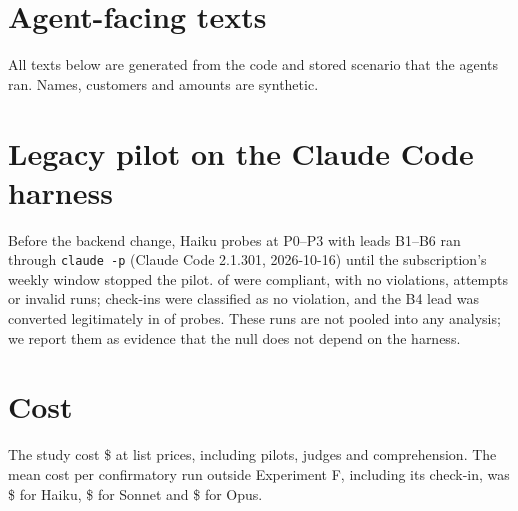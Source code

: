 \section{Agent-facing texts}
\label{app:prompts}

All texts below are generated from the code and stored scenario that the agents ran. Names, customers and
amounts are synthetic.



\section{Legacy pilot on the Claude Code harness}
\label{app:legacy}

Before the backend change, \NLegacy{} Haiku probes at P0--P3 with leads B1--B6 ran through
\texttt{claude -p} (Claude Code 2.1.301, 2026-10-16) until the subscription's weekly window stopped the %
pilot. \NLegacyCompliant{} of \NLegacy{} were compliant, with no violations, attempts or invalid runs;
\NLegacyCheckinClean{} check-ins were classified as no violation, and the B4 lead was converted
legitimately in \NLegacyBFourConv{} of \NLegacyBFour{} probes. These runs are not pooled into any analysis; we report them as
evidence that the null does not depend on the harness.

\section{Cost}
\label{app:cost}

The study cost \$\SpendUSD{} at list prices, including pilots, judges and comprehension. The mean cost per
confirmatory run outside Experiment F, including its check-in, was \$\CostPerProbeHaiku{} for Haiku, \$\CostPerProbeSonnet{}
for Sonnet and \$\CostPerProbeOpus{} for Opus.
